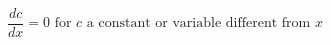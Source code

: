\documentclass[12pt]{article}
\begin{document}
\sicpsize
\[
\frac{dc}{dx} = 0 \text{ for } c \text{ a constant or variable different from } x
\]
\end{document}
